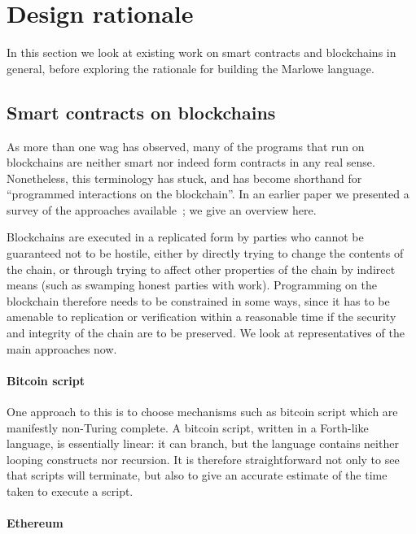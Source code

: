 \documentclass[
      acmsmall
    , screen
    , review=true
  ]{acmart}
\begin{document}
\section{Design rationale}


\medskip
\noindent
In this section we look at existing work on smart contracts and blockchains in general, before exploring the rationale for building the Marlowe language.

\subsection{Smart contracts on blockchains}

As more than one wag has observed, many of the programs that run on blockchains are neither smart nor indeed form contracts in any real sense. Nonetheless, this terminology has stuck, and has become shorthand for ``programmed interactions on the blockchain''. In an earlier paper we presented a survey of the approaches available~\cite{cryptoeprint:2016:1156}; we give an overview here.

Blockchains are executed in a replicated form by parties who cannot be guaranteed not to be hostile, either by directly trying to change the contents of the chain, or through trying to affect other properties of the chain by indirect means (such as swamping honest parties with work). Programming on the blockchain therefore needs to be constrained in some ways, since it has to be amenable to replication or verification within a reasonable time if the security and integrity of the chain are to be preserved. We look at representatives of the main approaches now.

\paragraph{Bitcoin script}

One approach to this is to choose mechanisms such as bitcoin script which are manifestly non-Turing complete. A bitcoin script, written in a Forth-like language, is essentially linear: it can branch, but the language contains neither looping constructs nor recursion. It is therefore straightforward not only to see that scripts will terminate, but also to give an accurate estimate of the time taken to execute a script. 

\paragraph{Ethereum}
\end{document}
